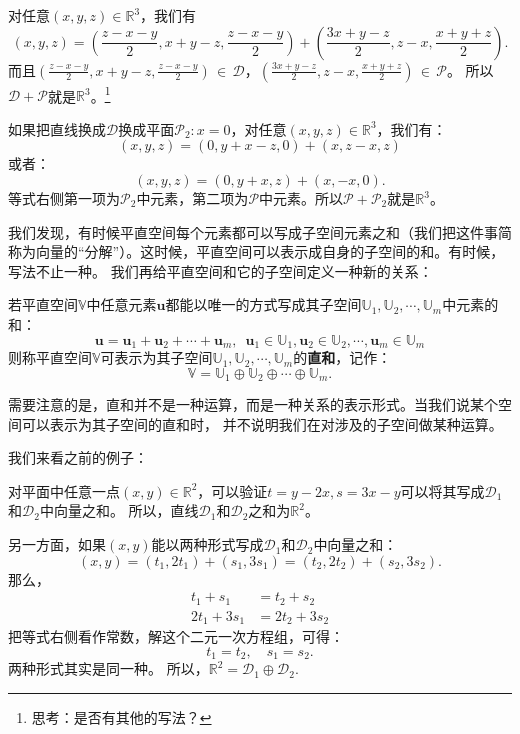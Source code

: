 \documentclass[12pt,UTF8,fontset=none]{ctexbook}
\begin{document}
对任意$(x,y,z) \in \mathbb{R}^3$，我们有
$$(x,y,z) = \left(\frac{z-x-y}{2},x+y-z,\frac{z-x-y}{2}\right) + \left(\frac{3x+y-z}{2},z-x,\frac{x+y+z}{2}\right).$$
而且$(\frac{z-x-y}{2},x+y-z,\frac{z-x-y}{2})\,\in\,\mathcal{D}$，$(\frac{3x+y-z}{2},z-x,\frac{x+y+z}{2})\,\in\,\mathcal{P}$。
所以$\mathcal{D}+\mathcal{P}$就是$\mathbb{R}^3$。\footnote{思考：是否有其他的写法？}

如果把直线换成$\mathcal{D}$换成平面$\mathcal{P}_2 : x = 0$，对任意$(x,y,z) \in \mathbb{R}^3$，我们有：
$$(x,y,z) = \left(0,y+x-z,0\right) + \left(x,z-x,z\right)$$
或者：
$$(x,y,z) = \left(0,y+x,z\right) + \left(x,-x,0\right).$$
等式右侧第一项为$\mathcal{P}_2$中元素，第二项为$\mathcal{P}$中元素。所以$\mathcal{P}+\mathcal{P}_2$就是$\mathbb{R}^3$。

我们发现，有时候平直空间每个元素都可以写成子空间元素之和（我们把这件事简称为向量的“分解”）。这时候，平直空间可以表示成自身的子空间的和。有时候，写法不止一种。
我们再给平直空间和它的子空间定义一种新的关系：

\begin{df}\label{df:1_4}
    若平直空间$\mathbb{V}$中任意元素$\mathbf{u}$都能以唯一的方式写成其子空间$\mathbb{U}_1, \mathbb{U}_2, \cdots , \mathbb{U}_m$中元素的和：
    $$ \mathbf{u} = \mathbf{u}_1+\mathbf{u}_2+\cdots+\mathbf{u}_m ,\,\,\, \mathbf{u}_1 \in \mathbb{U}_1, \mathbf{u}_2 \in \mathbb{U}_2, \cdots , \mathbf{u}_m \in \mathbb{U}_m $$
    则称平直空间$\mathbb{V}$可表示为其子空间$\mathbb{U}_1, \mathbb{U}_2, \cdots , \mathbb{U}_m$的\textbf{直和}，记作：
    $$ \mathbb{V} = \mathbb{U}_1 \oplus \mathbb{U}_2 \oplus \cdots \oplus \mathbb{U}_m.$$
\end{df}

需要注意的是，直和并不是一种运算，而是一种关系的表示形式。当我们说某个空间可以表示为其子空间的直和时，
并不说明我们在对涉及的子空间做某种运算。

我们来看之前的例子：

对平面中任意一点$(x,y)\in\mathbb{R}^2$，可以验证$t = y - 2x, s = 3x - y$可以将其写成$\mathcal{D}_1$和$\mathcal{D}_2$中向量之和。
所以，直线$\mathcal{D}_1$和$\mathcal{D}_2$之和为$\mathbb{R}^2$。

另一方面，如果$(x,y)$能以两种形式写成$\mathcal{D}_1$和$\mathcal{D}_2$中向量之和：
$$ (x, y) = (t_1, 2t_1) + (s_1, 3s_1) = (t_2, 2t_2) + (s_2, 3s_2).$$
那么，
\begin{align*}
    t_1 + s_1 &= t_2 + s_2  \\
    2t_1 + 3s_1 &= 2t_2 + 3s_2 
\end{align*}
把等式右侧看作常数，解这个二元一次方程组，可得：
$$ t_1 = t_2, \quad s_1 = s_2.$$
两种形式其实是同一种。
所以，$\mathbb{R}^2 = \mathcal{D}_1 \oplus \mathcal{D}_2.$
\end{document}
